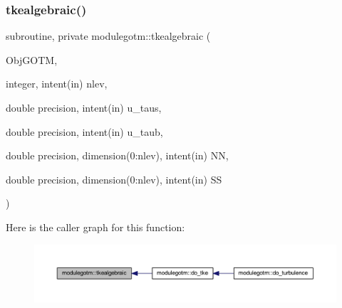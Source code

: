 \subsubsection{\texorpdfstring{tkealgebraic()}{tkealgebraic()}}
{\footnotesize\ttfamily subroutine, private modulegotm\+::tkealgebraic (\begin{DoxyParamCaption}\item[{}]{Obj\+G\+O\+TM,  }\item[{integer, intent(in)}]{nlev,  }\item[{double precision, intent(in)}]{u\+\_\+taus,  }\item[{double precision, intent(in)}]{u\+\_\+taub,  }\item[{double precision, dimension(0\+:nlev), intent(in)}]{NN,  }\item[{double precision, dimension(0\+:nlev), intent(in)}]{SS }\end{DoxyParamCaption})\hspace{0.3cm}{\ttfamily [private]}}

Here is the caller graph for this function\+:\nopagebreak
\begin{figure}[H]
\begin{center}
\leavevmode
\includegraphics[width=350pt]{namespacemodulegotm_afc07b47188fabbcdd572769fce2e7e97_icgraph}
\end{center}
\end{figure}
\mbox{\label{namespacemodulegotm_aa2677c2275ef6e84a615765d4db0772c}} 
